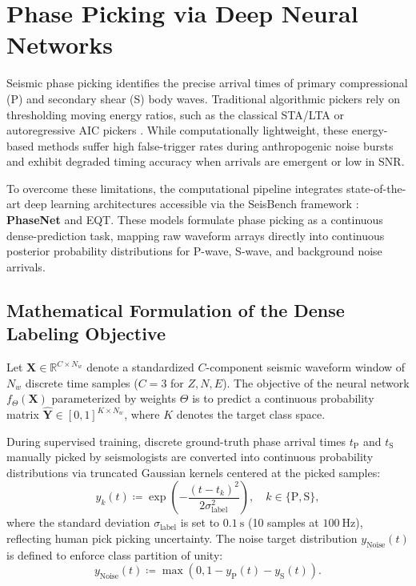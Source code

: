 \section{Phase Picking via Deep Neural Networks}
\label{sec:phase_picking}

Seismic phase picking identifies the precise arrival times of
primary compressional (P) and secondary shear (S) body waves.
Traditional algorithmic pickers rely on thresholding moving energy
ratios, such as the classical \ac{STA/LTA} or autoregressive \ac{AIC}
pickers \parencite{LEONARD1999247}. While
computationally lightweight, these energy-based methods suffer high
false-trigger rates during anthropogenic noise bursts and exhibit
degraded timing accuracy when arrivals are emergent or low in
\ac{SNR}.

To overcome these limitations, the computational pipeline integrates
state-of-the-art deep learning architectures accessible via the
SeisBench framework \parencite{SeisBench}: \textbf{\ac{PhaseNet}}
and \acf{EQT}. These models formulate
phase picking as a continuous dense-prediction task, mapping raw
waveform arrays directly into continuous posterior probability
distributions for P-wave, S-wave, and background noise arrivals.

\subsection{Mathematical Formulation of the Dense Labeling Objective}
Let $\mathbf{X} \in \mathbb{R}^{C \times N_w}$ denote a standardized
$C$-component seismic waveform window of $N_w$ discrete time samples
($C = 3$ for $Z, N, E$). The objective of the neural network
$f_\Theta(\mathbf{X})$ parameterized by weights $\Theta$ is to
predict a continuous probability matrix $\hat{\mathbf{Y}} \in [0,
1]^{K \times N_w}$, where $K$ denotes the target class space.

During supervised training, discrete ground-truth phase arrival
times $t_{\mathrm{P}}$ and $t_{\mathrm{S}}$ manually picked by
seismologists are converted
into continuous probability distributions via truncated Gaussian
kernels centered at the picked samples:
\begin{equation}
  y_k(t) \coloneqq \exp\left( - \frac{(t - t_k)^2}{2
  \sigma_{\mathrm{label}}^2} \right), \quad k \in \{\mathrm{P}, \mathrm{S}\},
\end{equation}
where the standard deviation $\sigma_{\mathrm{label}}$ is set to
$\qty{0.1}{\second}$ (\num{10} samples at $\qty{100}{\hertz}$), reflecting
human pick picking uncertainty. The noise target distribution
$y_{\mathrm{Noise}}(t)$ is defined to enforce class partition of unity:
\begin{equation}
  y_{\mathrm{Noise}}(t) \coloneqq \max\left(0, 1 - y_{\mathrm{P}}(t) -
  y_{\mathrm{S}}(t)\right).
\end{equation}

